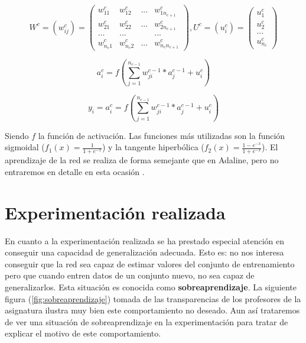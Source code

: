 \documentclass[11pt,spanish,listoffigures,listoftables]{workluis}
\begin{document}
\begin{equation}\label{eq:ej6}
W^c = (w_{ij}^c) = \begin{pmatrix}
w_{11}^c & w_{12}^c & ... & w_{1n_{c+1}}^c\\ 
w_{21}^c & w_{22}^c & ... & w_{2n_{c+1}}^c\\ 
... & ... & & ...\\ 
w_{n_{c}1}^c & w_{n_{c}2}^c & ... & w_{n_{c}n_{c+1}}^c 
\end{pmatrix}  ,  U^c = (u_{i}^c) = \begin{pmatrix}
u_{1}^c\\ 
u_{2}^c\\ 
...\\ 
u_{n_{c}}^c 
\end{pmatrix}
\end{equation}

\begin{equation}\label{eq:ej7}
a_{i}^c = f(\sum_{j=1}^{n_{c-1}}w_{ji}^{c-1}*a_{j}^{c-1} + u_{i}^{c})
\end{equation} 

\begin{equation}\label{eq:ej8}
y_{i} = a_{i}^c = f(\sum_{j=1}^{n_{c-1}}w_{ji}^{c-1}*a_{j}^{c-1} + u_{i}^{c})
\end{equation} 

\par Siendo $f$ la función de activación. Las funciones más utilizadas son la función sigmoidal ($f_{1}(x) = \frac{1}{1+e^{-x}}$) y la tangente hiperbólica ($f_{2}(x) = \frac{1-e^{-x}}{1+e^{-x}}$). El aprendizaje de la red se realiza de forma semejante que en Adaline, pero no entraremos en detalle en esta ocasión \cite{MLP}.

\section{Experimentación realizada}

\par En cuanto a la experimentación realizada se ha prestado especial atención en conseguir una capacidad de generalización adecuada. Esto es: no nos interesa conseguir que la red sea capaz de estimar valores del conjunto de entrenamiento pero que cuando entren datos de un conjunto nuevo, no sea capaz de generalizarlos. Esta situación es conocida como \textbf{sobreaprendizaje}. La siguiente figura (\ref{fig:sobreaprendizaje}) tomada de las transparencias de los profesores de la asignatura ilustra muy bien este comportamiento no deseado. Aun así trataremos de ver una situación de sobreaprendizaje en la experimentación para tratar de explicar el motivo de este comportamiento.
\end{document}
